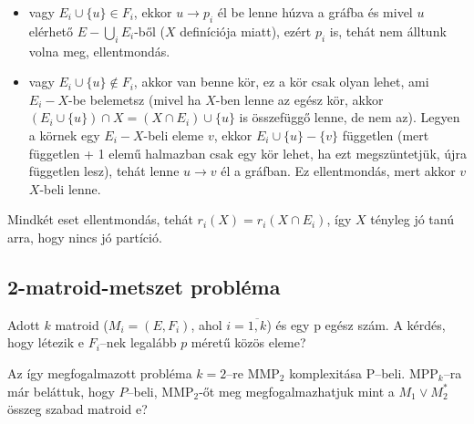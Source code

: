 \begin{itemize}
  \item vagy $E_i \cup \{u\} \in F_i$, ekkor $u \rightarrow p_i$ él be lenne
  húzva a gráfba és mivel $u$ elérhető $E - \bigcup_i E_i$-ből ($X$ definíciója
  miatt), ezért $p_i$ is, tehát nem álltunk volna meg, ellentmondás.
  \item vagy $E_i \cup \{u\} \not\in F_i$, akkor van benne kör, ez a kör csak
  olyan lehet, ami $E_i-X$-be belemetsz (mivel ha $X$-ben lenne az egész kör,
  akkor $(E_i \cup \{u\})\cap X = (X \cap E_i) \cup \{u\}$ is összefüggő lenne,
  de nem az). Legyen a körnek egy $E_i-X$-beli eleme $v$, ekkor $E_i \cup \{u\}
  - \{v\}$ független (mert független + 1 elemű halmazban csak egy kör lehet, ha
  ezt megszüntetjük, újra független lesz), tehát lenne $u \rightarrow v$ él a
  gráfban. Ez ellentmondás, mert akkor $v$ $X$-beli lenne.
\end{itemize}

Mindkét eset ellentmondás, tehát $r_i(X) = r_i(X \cap E_i)$, így $X$ tényleg jó
tanú arra, hogy nincs jó partíció.

\subsection{2-matroid-metszet probléma}

Adott $k$ matroid ($M_i=(E,F_i)$, ahol $i=\overline{1,k}$) és egy p egész szám.
A kérdés, hogy létezik e $F_i$--nek legalább $p$ méretű közös eleme?

Az így megfogalmazott probléma $k=2$--re MMP$_2$ komplexitása P--beli.
MPP$_k$--ra már beláttuk, hogy $P$--beli, MMP$_2$-őt meg megfogalmazhatjuk mint a
$M_1 \vee M_2^*$ összeg szabad matroid e?
